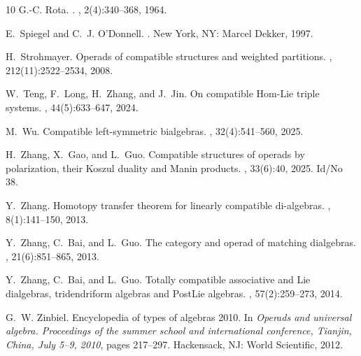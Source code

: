 \documentclass{jonasart}
\begin{document}
{\begin{thebibliography}{10}
        G.-C. Rota.
        .
        , 2(4):340--368,
        1964.
        
        E.~{Spiegel} and C.~J. {O'Donnell}.
        .
        \newblock New York, NY: Marcel Dekker, 1997.
        
        H.~Strohmayer.
        \newblock Operads of compatible structures and weighted partitions.
        , 212(11):2522--2534, 2008.
        
        W.~Teng, F.~Long, H.~Zhang, and J.~Jin.
        \newblock On compatible {Hom}-{Lie} triple systems.
        , 44(5):633--647, 2024.
        
        M.~Wu.
        \newblock Compatible left-symmetric bialgebras.
        , 32(4):541--560, 2025.
        
        H.~Zhang, X.~Gao, and L.~Guo.
        \newblock Compatible structures of operads by polarization, their {Koszul}
        duality and {Manin} products.
        , 33(6):40, 2025.
        \newblock Id/No 38.
        
        Y.~Zhang.
        \newblock Homotopy transfer theorem for linearly compatible di-algebras.
        , 8(1):141--150, 2013.
        
        Y.~Zhang, C.~Bai, and L.~Guo.
        \newblock The category and operad of matching dialgebras.
        , 21(6):851--865, 2013.
        
        Y.~Zhang, C.~Bai, and L.~Guo.
        \newblock Totally compatible associative and {Lie} dialgebras, tridendriform
        algebras and {PostLie} algebras.
        , 57(2):259--273, 2014.
        
        G.~W. Zinbiel.
        \newblock Encyclopedia of types of algebras 2010.
        \newblock In {\em Operads and universal algebra. Proceedings of the summer
        school and international conference, Tianjin, China, July 5--9, 2010}, pages
        217--297. Hackensack, NJ: World Scientific, 2012.
    \end{thebibliography}
    }
\end{document}
